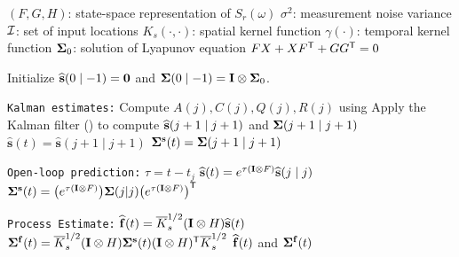 \documentclass[10pt]{article}
\begin{document}
\begin{algorithm}
    \caption{Kalman-based GP regression on $\calI$ at query time $t \in \bbR^{+}$}
    \label{alg:todescato-kalman-GP}

    \begin{algorithmic}[1]
        \Require 
            \Statex \hspace{\algorithmicindent} $(F,G,H)$: state-space representation of $S_r(\omega)$
            \Statex \hspace{\algorithmicindent} $\sigma^2$: measurement noise variance
            \Statex \hspace{\algorithmicindent} $\calI$: set of input locations
            \Statex \hspace{\algorithmicindent} $K_s(\cdot,\cdot)$: spatial kernel function
            \Statex \hspace{\algorithmicindent} $\gamma(\cdot)$: temporal kernel function
            \Statex \hspace{\algorithmicindent} $\bm{\Sigma}_0$: solution of Lyapunov equation $FX+XF^{\scriptstyle{\mathsf{T}}}+GG^{\scriptstyle{\mathsf{T}}}=0$

        \State Initialize $\widehat{\mathbf{s}}(0\mid -1) = \mathbf{0}$ and $\bm{\Sigma}(0\mid -1)=\mathbf{I}\otimes\bm{\Sigma}_0$.

        \Statex \texttt{Kalman estimates:}
            \State Compute $A(j), C(j), Q(j), R(j)$ using 
            \State Apply the Kalman filter () to compute $\widehat{\mathbf{s}}(j+1 \mid j+1)$ and $\bm{\Sigma}(j+1 \mid j+1)$
            \State $\widehat{\mathbf{s}}(t) = \widehat{\mathbf{s}}(j+1\mid j+1)$
            \State $\bm{\Sigma}^{\mathbf{s}}(t)=\bm{\Sigma}(j+1\mid j+1)$
        \EndWhile 

        \Statex \texttt{Open-loop prediction:}
        \State $\tau = t - t_j$
        \State $\widehat{\mathbf{s}}(t) = e^{\tau(\mathbf{I} \otimes F)}\widehat{\mathbf{s}}(j \mid j)$
        \State $\bm{\Sigma}^{\mathbf{s}}(t) = \big(e^{\tau(\mathbf{I} \otimes F)}\big)\bm{\Sigma}(j|j)\big(e^{\tau(\mathbf{I} \otimes F)}\big)^{\scriptstyle{\mathsf{T}}}$

        \Statex \texttt{Process Estimate:}
        \State $\widehat{\mathbf{f}}(t) = \overline{K}_{s}^{1/2}(\mathbf{I} \otimes H)\widehat{\mathbf{s}}(t)$
        \State $\bm{\Sigma}^{\mathbf{f}}(t) = \overline{K}_{s}^{1/2}(\mathbf{I} \otimes H)\bm{\Sigma}^{\mathbf{s}}(t)(\mathbf{I} \otimes H)^{\scriptstyle{\mathsf{T}}}\overline{K}_{s}^{1/2}$
        \State \Return $\widehat{\mathbf{f}}(t)$ and $\bm{\Sigma}^{\mathbf{f}}(t)$
    \end{algorithmic}
\end{algorithm}
\end{document}
